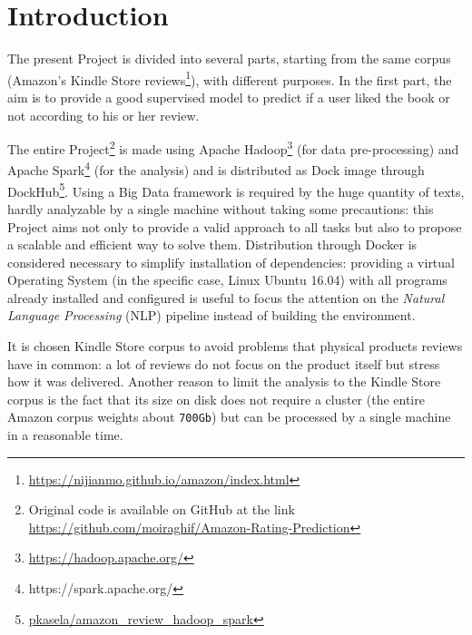 \documentclass[fleqn,10pt]{SelfArx}
\begin{document}
\flushbottom %

\maketitle
\tableofcontents
\newpage

\thispagestyle{empty} %


\section*{Introduction}

The present Project is divided into several parts, starting from the same corpus (Amazon's Kindle Store reviews\footnote{\url{https://nijianmo.github.io/amazon/index.html}}), with different purposes.
In the first part, the aim is to provide a good supervised model to predict if a user liked the book or not according to his or her review.\newline
\newline

The entire Project\footnote{Original code is available on GitHub at the link \url{https://github.com/moiraghif/Amazon-Rating-Prediction}} is made using Apache Hadoop\footnote{\url{https://hadoop.apache.org/}} (for data pre-processing) and Apache Spark\footnote{https://spark.apache.org/} (for the analysis) and is distributed as Dock image through DockHub\footnote{\url{pkasela/amazon_review_hadoop_spark}}.
Using a Big Data framework is required by the huge quantity of texts, hardly analyzable by a single machine without taking some precautions: this Project aims not only to provide a valid approach to all tasks but also to propose a scalable and efficient way to solve them.
Distribution through Docker is considered necessary to simplify installation of dependencies: providing a virtual Operating System (in the specific case, Linux Ubuntu 16.04) with all programs already installed and configured is useful to focus the attention on the \textit{Natural Language Processing} (NLP) pipeline instead of building the environment.

It is chosen Kindle Store corpus to avoid problems that physical products reviews have in common: a lot of reviews do not focus on the product itself but stress how it was delivered.
Another reason to limit the analysis to the Kindle Store corpus is the fact that its size on disk does not require a cluster (the entire Amazon corpus weights about \verb|700Gb|) but can be processed by a single machine in a reasonable time.
\end{document}
